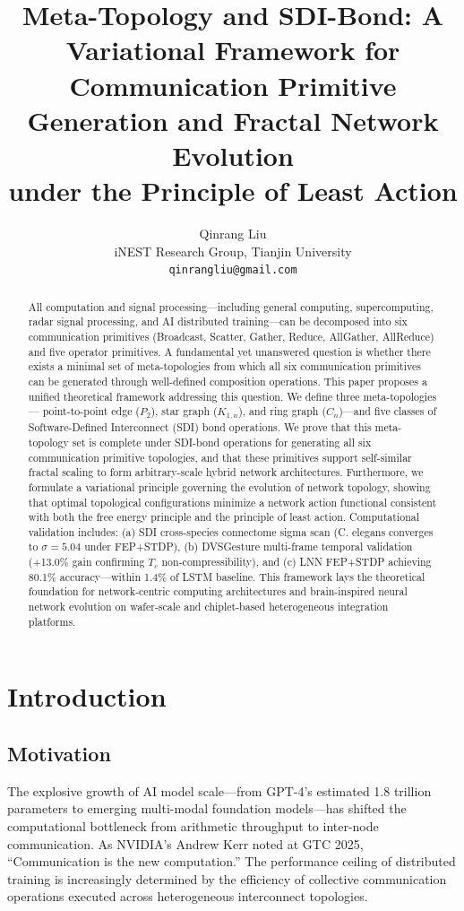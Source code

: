 \documentclass[12pt]{article}
\title{Meta-Topology and SDI-Bond: A Variational Framework for\\
Communication Primitive Generation and Fractal Network Evolution\\
under the Principle of Least Action}
\author{Qinrang Liu\\
iNEST Research Group, Tianjin University\\
\texttt{qinrangliu@gmail.com}}
\begin{document}
\maketitle

\begin{abstract}
All computation and signal processing---including general computing,
supercomputing, radar signal processing, and AI distributed
training---can be decomposed into six communication primitives
(Broadcast, Scatter, Gather, Reduce, AllGather, AllReduce) and
five operator primitives. A fundamental yet unanswered question
is whether there exists a minimal set of meta-topologies from which
all six communication primitives can be generated through well-defined
composition operations. This paper proposes a unified theoretical
framework addressing this question. We define three meta-topologies---
point-to-point edge ($P_2$), star graph ($K_{1,n}$), and ring graph
($C_n$)---and five classes of Software-Defined Interconnect (SDI)
bond operations. We prove that this meta-topology set is complete
under SDI-bond operations for generating all six communication
primitive topologies, and that these primitives support self-similar
fractal scaling to form arbitrary-scale hybrid network architectures.
Furthermore, we formulate a variational principle governing the
evolution of network topology, showing that optimal topological
configurations minimize a network action functional consistent with
both the free energy principle and the principle of least action.
Computational validation includes: (a) SDI cross-species connectome
sigma scan (C. elegans converges to $\sigma=5.04$ under FEP+STDP),
(b) DVSGesture multi-frame temporal validation (+13.0\% gain
confirming $T_c$ non-compressibility), and (c) LNN FEP+STDP
achieving 80.1\% accuracy---within 1.4\% of LSTM baseline. This
framework lays the theoretical foundation for network-centric
computing architectures and brain-inspired neural network evolution
on wafer-scale and chiplet-based heterogeneous integration platforms.
\end{abstract}

\section{Introduction}
\subsection{Motivation}

The explosive growth of AI model scale---from GPT-4's estimated 1.8
trillion parameters to emerging multi-modal foundation models---has
shifted the computational bottleneck from arithmetic throughput to
inter-node communication. As NVIDIA's Andrew Kerr noted at GTC 2025,
``Communication is the new computation.'' The performance ceiling of
distributed training is increasingly determined by the efficiency of
collective communication operations executed across heterogeneous
interconnect topologies.
\end{document}
